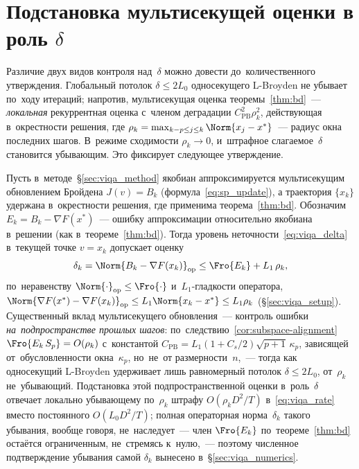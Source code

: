 \section{Подстановка мультисекущей оценки в роль $\delta$}\label{sec:viqa_subst}

Различие двух видов контроля над~$\delta$ можно довести до~количественного
утверждения. Глобальный потолок $\delta\le 2L_0$ односекущего L-Broyden не
убывает по~ходу итераций; напротив, мультисекущая оценка
теоремы~\ref{thm:bd}~--- \emph{локальная} рекуррентная оценка с~членом
деградации $C_{\mathrm{PB}}^2\rho_k^2$, действующая в~окрестности решения,
где $\rho_k=\max_{k-p\le j\le k}\Norm{x_j-x^*}$~--- радиус окна последних
шагов. В~режиме сходимости $\rho_k\to0$, и~штрафное слагаемое~$\delta$
становится убывающим. Это фиксирует следующее утверждение.

\begin{proposition}\label{prop:viqa_subst}
Пусть в~методе~\S\ref{sec:viqa_method} якобиан аппроксимируется
мультисекущим обновлением Бройдена $J(v)=B_k$ (формула~\eqref{eq:sp_update}), а
траектория $\{x_k\}$ удержана в~окрестности решения, где применима
теорема~\ref{thm:bd}. Обозначим $E_k = B_k - \nabla F(x^*)$~--- ошибку
аппроксимации относительно якобиана в~решении (как в~теореме~\ref{thm:bd}).
Тогда уровень неточности~\eqref{eq:viqa_delta} в~текущей точке $v=x_k$
допускает оценку
\[
  \delta_k = \Norm{B_k-\nabla F(x_k)}_{\mathrm{op}}
           \le \Fro{E_k} + L_1\,\rho_k,
\]
по~неравенству $\Norm{\cdot}_{\mathrm{op}}\le\Fro{\cdot}$ и~$L_1$-гладкости
оператора, $\Norm{\nabla F(x^*)-\nabla F(x_k)}_{\mathrm{op}}\le L_1\Norm{x_k-x^*}
\le L_1\rho_k$ (\S\ref{sec:viqa_setup}). Существенный вклад мультисекущего
обновления~--- контроль ошибки \emph{на~подпространстве прошлых шагов}:
по~следствию~\ref{cor:subspace-alignment} $\Fro{E_k\,S_p} = O(\rho_k)$
с~константой $C_{\mathrm{PB}}=L_1(1{+}C_s/2)\sqrt{p+1}\,\kappa_p$, зависящей
от~обусловленности окна~$\kappa_p$, но~не~от размерности~$n$,~--- тогда как
односекущий L-Broyden удерживает лишь равномерный потолок $\delta\le 2L_0$,
от~$\rho_k$ не~убывающий. Подстановка этой подпространственной оценки
в~роль~$\delta$ отвечает локально убывающему по~$\rho_k$ штрафу
$O(\rho_k D^2/T)$ в~\eqref{eq:viqa_rate} вместо постоянного $O(L_0 D^2/T)$;
полная операторная норма~$\delta_k$ такого убывания, вообще говоря,
не~наследует~--- член $\Fro{E_k}$ по~теореме~\ref{thm:bd} остаётся
ограниченным, не~стремясь к~нулю,~--- поэтому численное подтверждение
убывания самой $\delta_k$ вынесено в~\S\ref{sec:viqa_numerics}.
\end{proposition}

